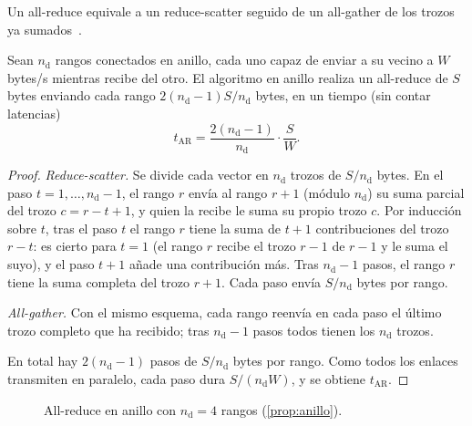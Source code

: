 Un all-reduce equivale a un reduce-scatter seguido de un all-gather de los trozos ya sumados~\cite{cs336}.

\begin{proposicion}\label{prop:anillo}
Sean $n_{\mathrm{d}}$ rangos conectados en anillo, cada uno capaz de enviar a su vecino a $W$ bytes/s mientras recibe del otro. El algoritmo en anillo realiza un all-reduce de $S$ bytes enviando cada rango $2(n_{\mathrm{d}}-1)S/n_{\mathrm{d}}$ bytes, en un tiempo (sin contar latencias)
\[
t_{\mathrm{AR}}=\frac{2(n_{\mathrm{d}}-1)}{n_{\mathrm{d}}}\cdot\frac{S}{W}.
\]
\end{proposicion}

\begin{proof}
\emph{Reduce-scatter.} Se divide cada vector en $n_{\mathrm{d}}$ trozos de $S/n_{\mathrm{d}}$ bytes. En el paso $t=1,\dots,n_{\mathrm{d}}-1$, el rango $r$ envía al rango $r+1$ (módulo $n_{\mathrm{d}}$) su suma parcial del trozo $c=r-t+1$, y quien la recibe le suma su propio trozo $c$. Por inducción sobre $t$, tras el paso $t$ el rango $r$ tiene la suma de $t+1$ contribuciones del trozo $r-t$: es cierto para $t=1$ (el rango $r$ recibe el trozo $r-1$ de $r-1$ y le suma el suyo), y el paso $t+1$ añade una contribución más. Tras $n_{\mathrm{d}}-1$ pasos, el rango $r$ tiene la suma completa del trozo $r+1$. Cada paso envía $S/n_{\mathrm{d}}$ bytes por rango.

\emph{All-gather.} Con el mismo esquema, cada rango reenvía en cada paso el último trozo completo que ha recibido; tras $n_{\mathrm{d}}-1$ pasos todos tienen los $n_{\mathrm{d}}$ trozos.

En total hay $2(n_{\mathrm{d}}-1)$ pasos de $S/n_{\mathrm{d}}$ bytes por rango. Como todos los enlaces transmiten en paralelo, cada paso dura $S/(n_{\mathrm{d}}W)$, y se obtiene $t_{\mathrm{AR}}$.
\end{proof}

\begin{figure}[h]
\centering
{}
\caption{All-reduce en anillo con $n_{\mathrm{d}}=4$ rangos (\cref{prop:anillo}).}
\label{fig:anillo}
\end{figure}

